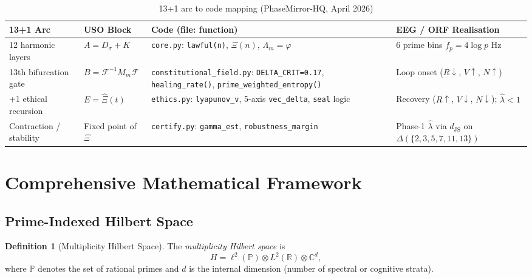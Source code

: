 \documentclass[12pt,a4paper]{article}
\theoremstyle{plain}
\theoremstyle{definition}
\newtheorem{definition}[theorem]{Definition}
\newcommand{\Lambdam}{\Lambda_m}
\newcommand{\hatlambda}{\hat{\lambda}}
\newcommand{\dJS}{d_{\mathrm{JS}}}
\newcommand{\PP}{\mathbb{P}}
\newcommand{\RR}{\mathbb{R}}
\newcommand{\CC}{\mathbb{C}}
\newcommand{\primes}{\{2,3,5,7,11,13\}}
\begin{document}
\begin{table}[H]
\centering
\caption{13+1 arc to code mapping (PhaseMirror-HQ, April 2026)}
\label{tab:mapping}
\renewcommand{\arraystretch}{1.3}
\begin{tabular}{@{} p{3cm} p{3cm} p{5cm} p{3.5cm} @{}}
  \toprule
  \textbf{13+1 Arc} & \textbf{USO Block} & \textbf{Code (file: function)} & \textbf{EEG / ORF Realisation} \\
  \midrule
  12 harmonic layers &
  $A = D_\sigma + K$ &
  \texttt{core.py}: \texttt{lawful(n)}, $\Xi(n)$, $\Lambdam = \varphi$ &
  6 prime bins $f_p = 4\log p$ Hz \\
  \addlinespace
  13th bifurcation gate &
  $B = \mathcal{F}^{-1}M_m\mathcal{F}$ &
  \texttt{constitutional\_field.py}: \texttt{DELTA\_CRIT=0.17}, \texttt{healing\_rate()}, \texttt{prime\_weighted\_entropy()} &
  Loop onset ($R\downarrow$, $V\uparrow$, $N\uparrow$) \\
  \addlinespace
  +1 ethical recursion &
  $E = \hat{\Xi}(t)$ &
  \texttt{ethics.py}: \texttt{lyapunov\_v}, 5-axis \texttt{vec\_delta}, \texttt{seal} logic &
  Recovery ($R\uparrow$, $V\downarrow$, $N\downarrow$); $\hatlambda < 1$ \\
  \addlinespace
  Contraction / stability &
  Fixed point of $\Xi$ &
  \texttt{certify.py}: \texttt{gamma\_est}, \texttt{robustness\_margin} &
  Phase-1 $\hatlambda$ via $\dJS$ on $\Delta(\primes)$ \\
  \bottomrule
\end{tabular}
\end{table}

\section{Comprehensive Mathematical Framework}
\label{sec:math}

\subsection{Prime-Indexed Hilbert Space}
\label{sec:math:hilbert}

\begin{definition}[Multiplicity Hilbert Space]
\label{def:hilbert}
The \emph{multiplicity Hilbert space} is
\begin{equation}
  H = \ell^2(\PP) \otimes L^2(\RR) \otimes \CC^d,
  \label{eq:hilbert}
\end{equation}
where $\PP$ denotes the set of rational primes and $d$ is the internal dimension
(number of spectral or cognitive strata).
\end{definition}
\end{document}
